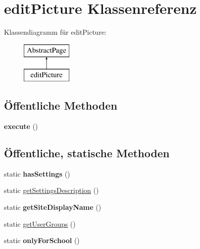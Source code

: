 \hypertarget{classedit_picture}{}\section{edit\+Picture Klassenreferenz}
\label{classedit_picture}
Klassendiagramm für edit\+Picture\+:\begin{figure}[H]
\begin{center}
\leavevmode
\includegraphics[height=2.000000cm]{classedit_picture}
\end{center}
\end{figure}
\subsection*{Öffentliche Methoden}
\begin{DoxyCompactItemize}
\item 
\mbox{\label{classedit_picture_ae3698756754e7f4825c0abbebf2456d3}} 
{\bfseries execute} ()
\end{DoxyCompactItemize}
\subsection*{Öffentliche, statische Methoden}
\begin{DoxyCompactItemize}
\item 
\mbox{\label{classedit_picture_aa8a302f047accabe9be8b6415c51b5e3}} 
static {\bfseries has\+Settings} ()
\item 
static \mbox{\hyperlink{classedit_picture_ad4465be4b4b6c81d258f64c9ab3c67e2}{get\+Settings\+Description}} ()
\item 
\mbox{\label{classedit_picture_aed1c0b6f637f32d43c2e138c95b6eba1}} 
static {\bfseries get\+Site\+Display\+Name} ()
\item 
static \mbox{\hyperlink{classedit_picture_a669cb68358763fad84048cb316df96c9}{get\+User\+Groups}} ()
\item 
\mbox{\label{classedit_picture_a8eeed35c83c875826fce9d8fe231cd66}} 
static {\bfseries only\+For\+School} ()
\end{DoxyCompactItemize}
